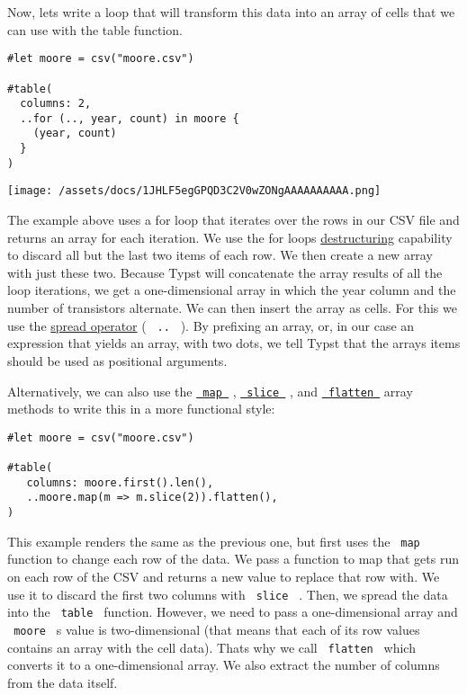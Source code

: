 Now, let\textquotesingle s write a loop that will transform this data
into an array of cells that we can use with the table function.

\begin{verbatim}
#let moore = csv("moore.csv")

#table(
  columns: 2,
  ..for (.., year, count) in moore {
    (year, count)
  }
)
\end{verbatim}

\texttt{[image: /assets/docs/1JHLF5egGPQD3C2V0wZONgAAAAAAAAAA.png]}

The example above uses a for loop that iterates over the rows in our CSV
file and returns an array for each iteration. We use the for
loop\textquotesingle s
\href{/docs/reference/scripting/\#bindings}{destructuring} capability to
discard all but the last two items of each row. We then create a new
array with just these two. Because Typst will concatenate the array
results of all the loop iterations, we get a one-dimensional array in
which the year column and the number of transistors alternate. We can
then insert the array as cells. For this we use the
\href{/docs/reference/foundations/arguments/\#spreading}{spread
operator} ( \texttt{\ ..\ } ). By prefixing an array, or, in our case an
expression that yields an array, with two dots, we tell Typst that the
array\textquotesingle s items should be used as positional arguments.

Alternatively, we can also use the
\href{/docs/reference/foundations/array/\#definitions-map}{\texttt{\ map\ }}
,
\href{/docs/reference/foundations/array/\#definitions-slice}{\texttt{\ slice\ }}
, and
\href{/docs/reference/foundations/array/\#definitions-flatten}{\texttt{\ flatten\ }}
array methods to write this in a more functional style:

\begin{verbatim}
#let moore = csv("moore.csv")

#table(
   columns: moore.first().len(),
   ..moore.map(m => m.slice(2)).flatten(),
)
\end{verbatim}

This example renders the same as the previous one, but first uses the
\texttt{\ map\ } function to change each row of the data. We pass a
function to map that gets run on each row of the CSV and returns a new
value to replace that row with. We use it to discard the first two
columns with \texttt{\ slice\ } . Then, we spread the data into the
\texttt{\ table\ } function. However, we need to pass a one-dimensional
array and \texttt{\ moore\ } \textquotesingle s value is two-dimensional
(that means that each of its row values contains an array with the cell
data). That\textquotesingle s why we call \texttt{\ flatten\ } which
converts it to a one-dimensional array. We also extract the number of
columns from the data itself.

